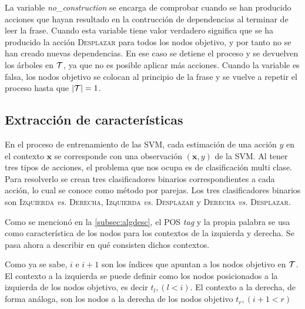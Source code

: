 La variable \emph{no\_construction} se encarga de comprobar cuando se han
producido acciones que hayan resultado en la contrucción de dependencias al
terminar de leer la frase. Cuando esta variable tiene valor verdadero significa
que se ha producido la acción \textsc{Desplazar} para todos los nodos objetivo,
y por tanto no se han creado nuevas dependencias. En ese caso se detiene el
proceso y se devuelven los árboles en ${\cal T}$, ya que no es posible aplicar
más acciones. Cuando la variable es falsa, los nodos objetivo se colocan al
principio de la frase y se vuelve a repetir el proceso hasta que $|{\cal T}| = 1$.

\subsection{Extracción de características}
\label{subsec:featureextraction}

En el proceso de entrenamiento de las \ac{SVM}, cada estimación de una acción
$y$ en el contexto $\mathbf{x}$ se corresponde con una observación
$(\mathbf{x}, y)$ de la \ac{SVM}. Al tener tres tipos de acciones, el problema
que nos ocupa es de clasificación multi clase. Para resolverlo se crean tres
clasificadores binarios correspondientes a cada acción, lo cual se conoce como
método por parejas. Los tres clasificadores binarios son \textsc{Izquierda}
\emph{vs.} \textsc{Derecha}, \textsc{Izquierda} \emph{vs.} \textsc{Desplazar} y
\textsc{Derecha} \emph{vs.}  \textsc{Desplazar}.

Como se mencionó en la \autoref{subsec:algdesc}, el \ac{POS} \emph{tag} y la
propia palabra se usa como característica de los nodos para los contextos de la
izquierda y derecha. Se pasa ahora a describir en qué consisten dichos
contextos.

Como ya se sabe, $i$ e $i + 1$ son los índices que apuntan a los nodos objetivo
en ${\cal T}$. El contexto a la izquierda se puede definir como los nodos
posicionados a la izquierda de los nodos objetivo, es decir $t_l, (l < i)$. El
contexto a la derecha, de forma análoga, son los nodos a la derecha de los nodos
objetivo $t_r,(i+1 <r)$

